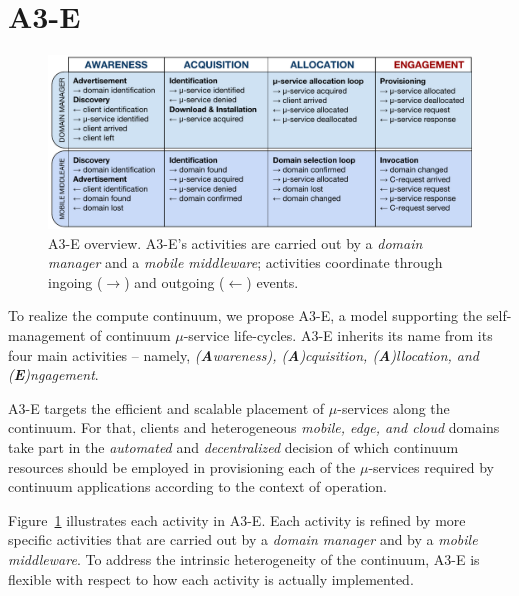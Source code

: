 \section{A3-E}\label{sec:A3-E}

\begin{figure}[tbp]
	\includegraphics[width=1\textwidth]{figs/A3-E-process}
	\caption{A3-E overview. A3-E's activities are carried out by a \textit{domain manager} and a \textit{mobile middleware}; activities coordinate through ingoing ($\rightarrow$) and outgoing ($\leftarrow$) events.}
	\label{fig:A3-E-process}
\end{figure}


To realize the compute continuum, we propose A3-E, a model supporting the self-management of continuum $\mu$-service life-cycles. A3-E inherits its name from its four main activities -- namely, \textit{(\textbf{A}wareness), (\textbf{A})cquisition, (\textbf{A})llocation, and (\textbf{E})ngagement}. 

A3-E targets the efficient and scalable placement of $\mu$-services along the continuum. For that, clients and heterogeneous \textit{mobile, edge, and cloud} domains take part in the \textit{automated} and \textit{decentralized} decision of which continuum resources should be employed in provisioning each of the $\mu$-services required by continuum applications according to the context of operation.

Figure~\ref{fig:A3-E-process} illustrates each activity in A3-E. Each activity is refined by more specific activities that are carried out by a \textit{domain manager} and by a \textit{mobile middleware}. %
To address the intrinsic heterogeneity of the continuum, A3-E is flexible with respect to how each activity is actually implemented.

